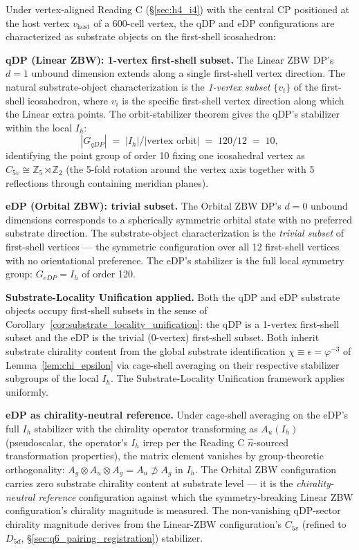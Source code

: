 \documentclass[11pt,letterpaper]{article}
\newcommand{\phig}{\varphi}
\begin{document}
Under vertex-aligned Reading C (\S\ref{sec:h4_i4}) with the central CP positioned at the host vertex $v_{\text{host}}$ of a 600-cell vertex, the qDP and eDP configurations are characterized as substrate objects on the first-shell icosahedron:

\textbf{qDP (Linear ZBW): 1-vertex first-shell subset.} The Linear ZBW DP's $d = 1$ unbound dimension extends along a single first-shell vertex direction. The natural substrate-object characterization is the \emph{1-vertex subset} $\{v_i\}$ of the first-shell icosahedron, where $v_i$ is the specific first-shell vertex direction along which the Linear extra points. The orbit-stabilizer theorem gives the qDP's stabilizer within the local $I_h$:
\begin{equation}\label{eq:qdp_c5v_stabilizer}
|G_{qDP}| \;=\; |I_h|/|\text{vertex orbit}| \;=\; 120/12 \;=\; 10,
\end{equation}
identifying the point group of order 10 fixing one icosahedral vertex as $C_{5v} \cong \mathbb{Z}_5 \rtimes \mathbb{Z}_2$ (the 5-fold rotation around the vertex axis together with 5 reflections through containing meridian planes).

\textbf{eDP (Orbital ZBW): trivial subset.} The Orbital ZBW DP's $d = 0$ unbound dimensions corresponds to a spherically symmetric orbital state with no preferred substrate direction. The substrate-object characterization is the \emph{trivial subset} of first-shell vertices --- the symmetric configuration over all 12 first-shell vertices with no orientational preference. The eDP's stabilizer is the full local symmetry group: $G_{eDP} = I_h$ of order 120.

\textbf{Substrate-Locality Unification applied.} Both the qDP and eDP substrate objects occupy first-shell subsets in the sense of Corollary~\ref{cor:substrate_locality_unification}: the qDP is a 1-vertex first-shell subset and the eDP is the trivial (0-vertex) first-shell subset. Both inherit substrate chirality content from the global substrate identification $\chi \equiv \epsilon = \phig^{-3}$ of Lemma~\ref{lem:chi_epsilon} via cage-shell averaging on their respective stabilizer subgroups of the local $I_h$. The Substrate-Locality Unification framework applies uniformly.

\textbf{eDP as chirality-neutral reference.} Under cage-shell averaging on the eDP's full $I_h$ stabilizer with the chirality operator transforming as $A_u(I_h)$ (pseudoscalar, the operator's $I_h$ irrep per the Reading C $\hat{n}$-sourced transformation properties), the matrix element vanishes by group-theoretic orthogonality: $A_g \otimes A_u \otimes A_g = A_u \not\supset A_g$ in $I_h$. The Orbital ZBW configuration carries zero substrate chirality content at substrate level --- it is the \emph{chirality-neutral reference} configuration against which the symmetry-breaking Linear ZBW configuration's chirality magnitude is measured. The non-vanishing qDP-sector chirality magnitude derives from the Linear-ZBW configuration's $C_{5v}$ (refined to $D_{5d}$, \S\ref{sec:q6_pairing_registration}) stabilizer.
\end{document}
